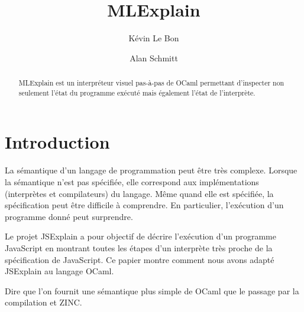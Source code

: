 \documentclass{easychair}
\title{MLExplain}
\author{
  Kévin Le Bon\inst{1}
  \and
  Alan Schmitt\inst{1}
}
\institute{
  Inria
 }
\begin{document}
\maketitle

\begin{abstract}
MLExplain est un interpréteur visuel pas-à-pas de OCaml permettant
d'inspecter non seulement l'état du programme exécuté mais également
l'état de l'interprète.
\end{abstract}

\section{Introduction}

La sémantique d'un langage de programmation peut être très complexe. Lorsque la
sémantique n'est pas spécifiée, elle correspond aux implémentations (interprètes
et compilateurs) du langage. Même quand elle est spécifiée, la spécification
peut être difficile à comprendre. En particulier, l'exécution d'un programme
donné peut surprendre.

Le projet JSExplain a pour objectif de décrire l'exécution d'un programme
JavaScript en montrant toutes les étapes d'un interprète très proche de la
spécification de JavaScript. Ce papier montre comment nous avons adapté
JSExplain au langage OCaml.

Dire que l'on fournit une sémantique plus simple de OCaml que le passage par la
compilation et ZINC.
\end{document}
